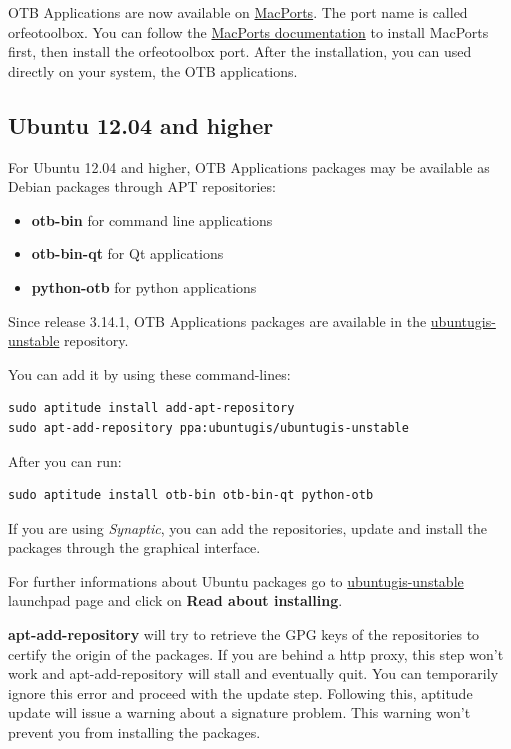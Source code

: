 OTB Applications are now available on \href{http://http://www.macports.org/}{MacPorts}.
The port name is called orfeotoolbox.
You can follow the \href{ http://guide.macports.org/}{MacPorts documentation} to install MacPorts first, then install the orfeotoolbox port.
After the installation, you can used directly on your system, the OTB applications.

\subsection{Ubuntu 12.04 and higher}
For Ubuntu 12.04 and higher, OTB Applications packages may be available as
Debian packages through APT repositories:
\begin{itemize}
\item \textbf{otb-bin} for command line applications
\item \textbf{otb-bin-qt} for Qt applications
\item \textbf{python-otb} for python applications
\end{itemize}

Since release 3.14.1, OTB Applications packages are available in the
\href{https://launchpad.net/~ubuntugis/+archive/ubuntugis-unstable}{ubuntugis-unstable} repository.

You can add it by using these command-lines:
\begin{verbatim}
sudo aptitude install add-apt-repository
sudo apt-add-repository ppa:ubuntugis/ubuntugis-unstable
\end{verbatim}

After you can run:
\begin{verbatim}
sudo aptitude install otb-bin otb-bin-qt python-otb
\end{verbatim}

If you are using \emph{Synaptic}, you can add the repositories, update and install the packages through the
graphical interface.

For further informations about Ubuntu packages go to
\href{https://launchpad.net/~ubuntugis/+archive/ubuntugis-unstable}{ubuntugis-unstable}
launchpad page and click on \textbf{Read about installing}.

\textbf{apt-add-repository} will try to retrieve the GPG keys of the
repositories to certify the origin of the packages. If you are behind a http
proxy, this step won't work and apt-add-repository will stall and eventually
quit. You can temporarily ignore this error and proceed with the update
step. Following this, aptitude update will issue a warning about a signature
problem. This warning won't prevent you from installing the packages.

